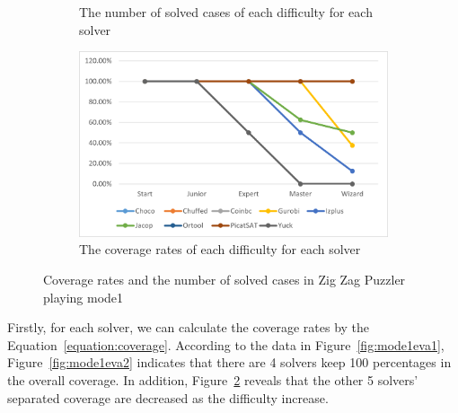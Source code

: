 \begin{figure}[htbp]
\begin{subfigure}[b]{0.48\textwidth}
    \caption{The number of solved cases of each difficulty for each solver}
    \label{fig:mode1eva3}
    \end{subfigure}
    \begin{subfigure}[b]{0.48\textwidth}
    \includegraphics[width=\textwidth]{figs/mode1seperatedcoverage.png}
    \caption{The coverage rates of each difficulty for each solver}
    \label{fig:mode1eva4}
    \end{subfigure}
    \caption{Coverage rates and the number of solved cases in Zig Zag Puzzler playing mode1}
    \label{fig:comparisonmode1}
\end{figure}
Firstly, for each solver, we can calculate the coverage rates by the Equation~\ref{equation:coverage}. According to the data in Figure~\ref{fig:mode1eva1}, Figure~\ref{fig:mode1eva2} indicates that there are 4 solvers keep 100 percentages in the overall coverage. In addition, Figure~\ref{fig:mode1eva4} reveals that the other 5 solvers' separated coverage are decreased as the difficulty increase. 
